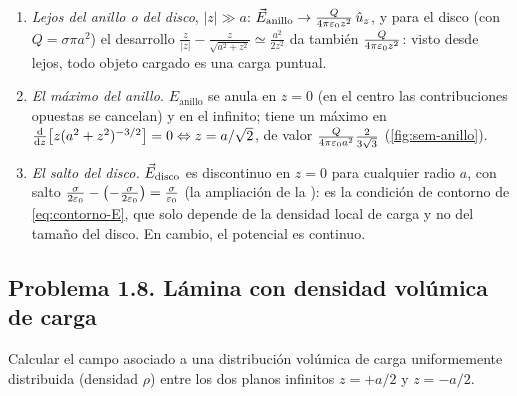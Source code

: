 \begin{observacion}
\begin{enumerate}[label=(\alph*)]
  \item \emph{Lejos del anillo o del disco}, $\lvert z\rvert\gg a$: $\vec{E}_{\mathrm{anillo}}\to\frac{Q}{4\pi\varepsilon_{0} z^{2}}\,\hat{u}_{z}$, y para el disco (con $Q=\sigma\pi a^{2}$) el desarrollo $\frac{z}{\lvert z\rvert}-\frac{z}{\sqrt{a^{2}+z^{2}}}\simeq\frac{a^{2}}{2z^{2}}$ da
        también $\frac{Q}{4\pi\varepsilon_{0} z^{2}}$: visto desde lejos, todo objeto cargado es una carga puntual.
  \item \emph{El máximo del anillo.} $E_{\mathrm{anillo}}$ se anula en $z=0$ (en el centro las contribuciones opuestas se cancelan) y en el infinito; tiene un máximo en $\frac{\mathrm{d}}{\mathrm{d} z}\bigl[z(a^{2}+z^{2})^{-3/2}\bigr]=0\Leftrightarrow z=a/\sqrt2$,
        de valor $\frac{Q}{4\pi\varepsilon_{0} a^{2}}\frac{2}{3\sqrt3}$ (\cref{fig:sem-anillo}).
  \item \emph{El salto del disco.} $\vec{E}_{\mathrm{disco}}$ es discontinuo en $z=0$ para cualquier radio $a$, con salto $\frac{\sigma}{2\varepsilon_{0}}-\bigl(-\frac{\sigma}{2\varepsilon_{0}}\bigr)=\frac{\sigma}{\varepsilon_{0}}$ (la ampliación de la ): es la condición de contorno
        de \cref{eq:contorno-E}, que solo depende de la densidad local de carga y no del tamaño del disco. En cambio, el potencial es continuo.
\end{enumerate}
\end{observacion}



\subsection{Problema 1.8. Lámina con densidad volúmica de carga}\label{sem:lamina}
\begin{ejercicio}\label{ejer:lamina}
Calcular el campo asociado a una distribución volúmica de carga uniformemente distribuida (densidad $\rho$) entre los dos planos infinitos $z=+a/2$ y $z=-a/2$.
\end{ejercicio}

